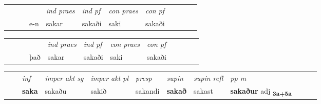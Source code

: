 \begin{tabular}{llllllllllll}
 & &  & &  \textit{ind praes} & \textit{ind pf} & \textit{con praes} & \textit{con pf} \\*
&  & & e-n & sakar & sakaði & saki & sakaði \\*
\cmidrule{5-9}
\end{tabular}


\begin{tabular}{llllllllllll}
 & &  & &  \textit{ind praes} & \textit{ind pf} & \textit{con praes} & \textit{con pf} \\*
&  & & það & sakar & sakaði & saki & sakaði \\*
\cmidrule{5-9}
\end{tabular}


\begin{tabular}{llllllllllll}
 & & \textit{inf} & \textit{imper akt sg} & \textit{imper akt pl}   & \textit{presp} & \textit{supin} & \textit{supin refl} & \textit{pp m}     \\*
  & & \textbf{saka} & sakaðu  & sakið   & sakandi &  \textbf{sakað} & sakast & \textbf{sakaður} adj \textbf{\textsubscript{3a+5a}} \\*
\cmidrule{1-12}
\end{tabular}



